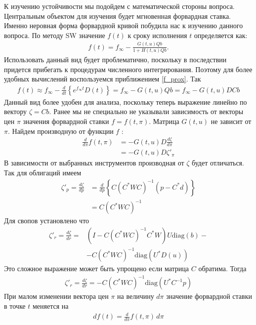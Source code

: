 \documentclass[10pt]{article}
\theoremstyle{definition}
\theoremstyle{remark}
\theoremstyle{plain}
\newcommand{\diag}{\mathrm{diag}}
\newcommand{\w}{f_\infty}
\newcommand{\scalar}[2]{\left<#1,#2\right>}
\begin{document}
К изучению устойчивости мы подойдем с математической стороны вопроса. Центральным объектом для изучения будет мгновенная форвардная ставка. Именно неровная форма форвардной кривой побудила нас к изучению данного вопроса. По методу SW значение $f(t)$ к сроку исполнения $t$ определяется как:
\begin{align*}
	f(t) = \w - \frac{G(t,u)Qb}{1 + H(t,u)Qb}.
\end{align*}
Использовать данный вид будет проблематично, поскольку в последствии придется прибегать к процедурам численного интегрирования. Поэтому для более удобных вычислений воспользуемся приближением \eqref{f_prox}. Так
\begin{align*}
	f(t) \approx \w - \frac{d}{dt}\left\{e^{\w t}D(t)\right\} = \w - G(t,u)Qb = \w - G(t,u)DCb
\end{align*}
Данный вид более удобен для анализа, поскольку теперь выражение линейно по вектору $\zeta = Cb$. Ранее мы не специально не указывали зависимость от векторы цен $\pi$ значения форвардной ставки $f = f(t,\pi)$.  Матрица $G(t,u)$ не зависит от $\pi$. Найдем производную от функции $f$ :
\begin{align*}
\frac{d}{d\pi}f(t,\pi) &= -G(t,u)D\frac{d\zeta}{d\pi}\\
&= -G(t,u)D\zeta'_{\pi}
\end{align*}
В зависимости от выбранных инструментов производная от $\zeta$ будет отличаться. Так для облигаций имеем
\begin{align*}
\zeta'_p = \frac{d\zeta}{dp}&= \frac{d}{dp}\left\{C\left(C^*WC\right)^{-1}(p-C^*d)\right\} \\
&= C\left(C^*WC\right)^{-1}
\end{align*}
Для свопов установлено что
\begin{align*}
\zeta'_r = \frac{d\zeta}{dr} =& \left(I - C\left(C^*WC\right)^{-1}C^*W\right)U\diag(b)-\\
&-C\left(C^*WC\right)^{-1}\diag\left(U^*D(u)\right)
\end{align*}
Это сложное выражение может быть упрощено если матрица $C$ обратима. Тогда
\begin{align*}
\zeta'_r = \frac{d\zeta}{dr}=-C\left(C^*WC\right)^{-1}\diag\left(U^* C^{-1}p\right)
\end{align*}
При малом изменении вектора цен $\pi$ на величину $d\pi$ значение форвардной ставки в точке $t$ меняется на 
\begin{align*}
df(t) = \frac{d}{d\pi}f(t,\pi)\,d\pi
\end{align*}
\end{document}

